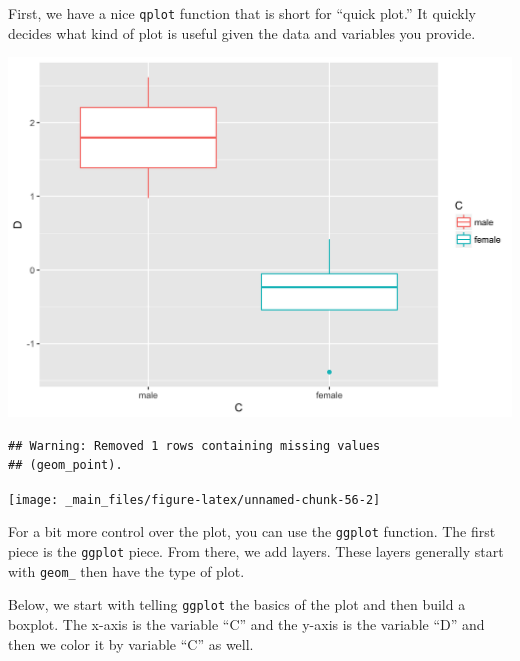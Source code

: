 \documentclass[]{tufte-book}
\newenvironment{Shaded}{}{}
\newcommand{\KeywordTok}[1]{\textcolor[rgb]{0.00,0.44,0.13}{\textbf{#1}}}
\newcommand{\OperatorTok}[1]{\textcolor[rgb]{0.40,0.40,0.40}{#1}}
\newcommand{\NormalTok}[1]{#1}
\theoremstyle{definition}
\theoremstyle{definition}
\theoremstyle{remark}
\begin{document}
First, we have a nice \texttt{qplot} function that is short for ``quick
plot.'' It quickly decides what kind of plot is useful given the data
and variables you provide.

\begin{Shaded}
\end{Shaded}

\includegraphics{_main_files/figure-latex/unnamed-chunk-56-1}

\begin{Shaded}
\end{Shaded}

\begin{verbatim}
## Warning: Removed 1 rows containing missing values
## (geom_point).
\end{verbatim}

\texttt{[image: \_main\_files/figure-latex/unnamed-chunk-56-2]}

For a bit more control over the plot, you can use the \texttt{ggplot}
function. The first piece is the \texttt{ggplot} piece. From there, we
add layers. These layers generally start with \texttt{geom\_} then have
the type of plot.

Below, we start with telling \texttt{ggplot} the basics of the plot and
then build a boxplot. The x-axis is the variable ``C'' and the y-axis is
the variable ``D'' and then we color it by variable ``C'' as well.
\end{document}

